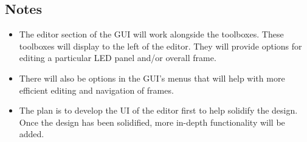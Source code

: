 \documentclass{article}
\begin{document}
	\subsection{Notes}
	\begin{itemize}
		\item The editor section of the GUI will work alongside the toolboxes. These toolboxes will display to the left of the editor. They will provide options for editing a particular LED panel and/or overall frame. %
		\item There will also be options in the GUI's menus that will help with more efficient editing and navigation of frames.
		\item The plan is to develop the UI of the editor first to help solidify the design. Once the design has been solidified, more in-depth functionality will be added.
	\end{itemize}
	
\end{document}
